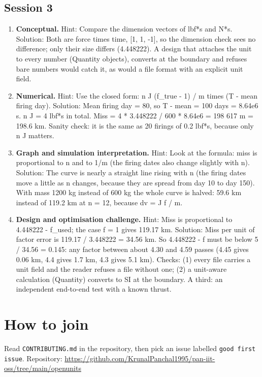 \documentclass[11pt,a4paper]{article}
\begin{document}
\subsection*{Session 3}
\begin{enumerate}[nosep]
\item \textbf{Conceptual.} Hint: Compare the dimension vectors of lbf*s and N*s. Solution: Both are force times time, [1, 1, -1], so the dimension check sees no difference; only their size differs (4.448222). A design that attaches the unit to every number (Quantity objects), converts at the boundary and refuses bare numbers would catch it, as would a file format with an explicit unit field.
\item \textbf{Numerical.} Hint: Use the closed form: n J (f\_true - 1) / m times (T - mean firing day). Solution: Mean firing day = 80, so T - mean = 100 days = 8.64e6 s. n J = 4 lbf*s in total. Miss = 4 * 3.448222 / 600 * 8.64e6 = 198 617 m = 198.6 km. Sanity check: it is the same as 20 firings of 0.2 lbf*s, because only n J matters.
\item \textbf{Graph and simulation interpretation.} Hint: Look at the formula: miss is proportional to n and to 1/m (the firing dates also change slightly with n). Solution: The curve is nearly a straight line rising with n (the firing dates move a little as n changes, because they are spread from day 10 to day 150). With mass 1200 kg instead of 600 kg the whole curve is halved: 59.6 km instead of 119.2 km at n = 12, because dv = J f / m.
\item \textbf{Design and optimisation challenge.} Hint: Miss is proportional to \textbar{}4.448222 - f\_used\textbar{}; the case f = 1 gives 119.17 km. Solution: Miss per unit of factor error is 119.17 / 3.448222 = 34.56 km. So \textbar{}4.448222 - f\textbar{} must be below 5 / 34.56 = 0.145: any factor between about 4.30 and 4.59 passes (4.45 gives 0.06 km, 4.4 gives 1.7 km, 4.3 gives 5.1 km). Checks: (1) every file carries a unit field and the reader refuses a file without one; (2) a unit-aware calculation (Quantity) converts to SI at the boundary. A third: an independent end-to-end test with a known thrust.
\end{enumerate}

\section{How to join}
Read \texttt{CONTRIBUTING.md} in the repository, then pick an issue labelled \texttt{good first issue}. Repository: \url{https://github.com/KrunalPanchal1995/pan-iit-oss/tree/main/openunits}
\end{document}

